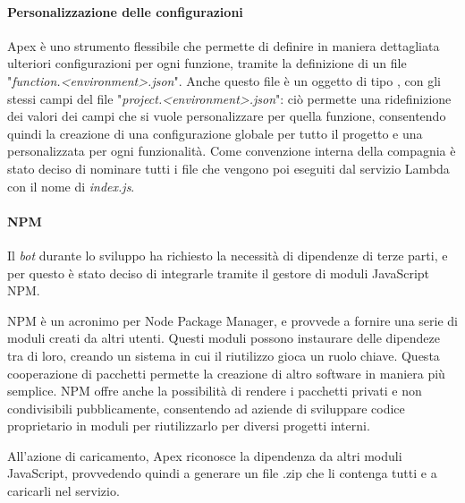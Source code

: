 \paragraph*{Personalizzazione delle configurazioni} Apex è uno strumento
flessibile che permette di definire in maniera dettagliata ulteriori
configurazioni per ogni funzione, tramite la definizione di un file
"\textit{function.<environment>.json}". Anche questo file è un oggetto di tipo
, con gli stessi campi del file
"\textit{project.<environment>.json}": ciò permette una ridefinizione dei valori
dei campi che si vuole personalizzare per quella funzione, consentendo quindi
la creazione di una configurazione globale per tutto il progetto e una
personalizzata per ogni funzionalità.
Come convenzione interna della compagnia è stato deciso di nominare tutti i
file che vengono poi eseguiti dal servizio Lambda con il nome di
\textit{index.js}.

\paragraph*{NPM} Il \textit{bot} durante lo sviluppo ha richiesto la necessità
di dipendenze di terze parti, e per questo è stato deciso di integrarle tramite
il gestore di moduli JavaScript NPM.

NPM è un acronimo per Node Package Manager, e provvede a fornire una serie di
moduli creati da altri utenti. Questi moduli possono instaurare delle dipendeze
tra di loro, creando un sistema in cui il riutilizzo gioca un ruolo chiave.
Questa cooperazione di pacchetti permette la creazione di altro software in
maniera più semplice.
NPM offre anche la possibilità di rendere i pacchetti privati e non
condivisibili pubblicamente, consentendo ad aziende di sviluppare codice
proprietario in moduli per riutilizzarlo per diversi progetti interni.

All'azione di caricamento, Apex riconosce la dipendenza da altri moduli
JavaScript, provvedendo quindi a generare un file .zip che li contenga tutti e
a caricarli nel servizio.

